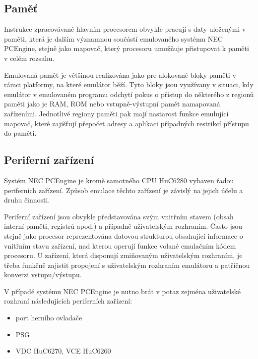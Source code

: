 
\subsection{Paměť}

Instrukce zpracovávané hlavním procesorem obvykle pracují s daty uloženými v
paměti, která je dalším významnou součástí emulovaného systému NEC PCEngine,
stejně jako mapovač, který procesoru umožňuje přistupovat k paměti v celém
rozsahu.

Emulovaná pamět je většinou realizována jako pre-alokované bloky paměti v rámci
platformy, na které emulátor běží. Tyto bloky jsou využívany v situaci, kdy
emulátor v emulovaném programu odchytí pokus o přístup do některého z regionů
paměti jako je RAM, ROM nebo vstupně-výstupní pamět namapovaná zařízeními.
Jednotlivé regiony paměti pak mají nastarost funkce emulující mapovač, které
zajišťují přepočet adresy a aplikaci případných restrikcí přístupu do paměti.



\subsection{Periferní zařízení}

Systém NEC PCEngine je kromě samotného CPU HuC6280 vybaven řadou periferních
zařízení. Způsob emulace těchto zařízení je závislý na jejich účelu a druhu
činnosti.

Periferní zařízení jsou obvykle představována svým vnitřním stavem (obsah
interní paměti, registrů apod.) a případně uživatelským rozhraním. Často jsou
stejně jako procesor reprezentována datovou strukturou obsahující informace o
vnitřním stavu zařízení, nad kterou operují funkce volané emulačním kódem
procesoru. U zařízení, která disponují zmiňovaným uživatelským rozhraním, je
třeba funkčně zajistit propojení s uživatelským rozhraním emulátoru a patřičnou
konverzi vstupu/výstupu.

V případě systému NEC PCEngine je nutno brát v potaz zejména uživatelské
rozhraní následujících periferních zařízení:

\begin{itemize}
\item port herního ovladače
\item PSG
\item VDC HuC6270, VCE HuC6260
\end{itemize}

